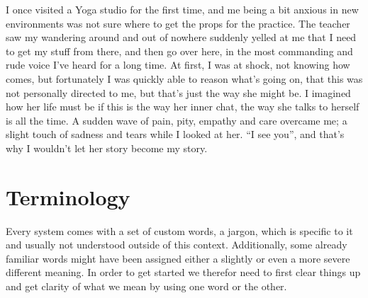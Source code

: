 I once visited a Yoga studio for the first time, and me being a bit anxious in new environments was not sure where to get the props for the practice.
The teacher saw my wandering around and out of nowhere suddenly yelled at me that I need to get my stuff from there, and then go over here, in the most commanding and rude voice I've heard for a long time.
At first, I was at shock, not knowing how comes, but fortunately I was quickly able to reason what's going on, that this was not personally directed to me, but that's just the way she might be.
I imagined how her life must be if this is the way her inner chat, the way she talks to herself is all the time.
A sudden wave of pain, pity, empathy and care overcame me; a slight touch of sadness and tears while I looked at her.
``I see you'', and that's why I wouldn't let her story become my story.

\section{Terminology}\label{sec:terminology}


Every system comes with a set of custom words, a jargon, which is specific to it and usually not understood outside of this context.
Additionally, some already familiar words might have been assigned either a slightly or even a more severe different meaning.
In order to get started we therefor need to first clear things up and get clarity of what we mean by using one word or the other.

